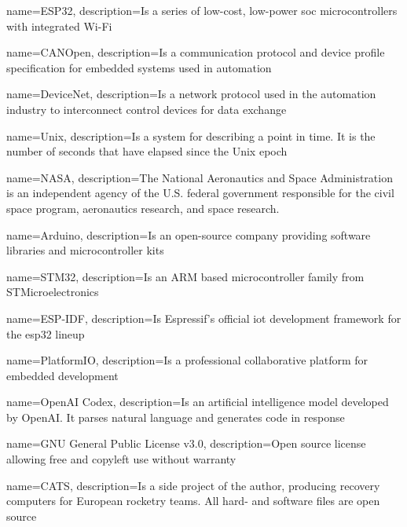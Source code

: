{
        name=ESP32,
        description={Is a series of low-cost, low-power \acrlong{soc} microcontrollers with integrated Wi-Fi}
}

{
        name=CANOpen,
        description={Is a communication protocol and device profile specification for embedded systems used in automation}
}

{
        name=DeviceNet,
        description={Is a network protocol used in the automation industry to interconnect control devices for data exchange}
}

{
        name=Unix,
        description={Is a system for describing a point in time. It is the number of seconds that have elapsed since the Unix epoch}
}

{
        name=NASA,
        description={The National Aeronautics and Space Administration is an independent agency of the U.S. federal government responsible for the civil space program, aeronautics research, and space research.}
}

{
        name=Arduino,
        description={Is an open-source company providing software libraries and microcontroller kits}
}

{
        name=STM32,
        description={Is an ARM based microcontroller family from STMicroelectronics}
}

{
        name=ESP-IDF,
        description={Is Espressif's official \acrshort{iot} development framework for the \gls{esp32} lineup}
}

{
        name=PlatformIO,
        description={Is a professional collaborative platform for embedded development}
}

{
        name=OpenAI Codex,
        description={Is an artificial intelligence model developed by OpenAI. It parses natural language and generates code in response}
}

{
        name=GNU General Public License v3.0,
        description={Open source license allowing free and copyleft use without warranty}
}

{
        name=CATS,
        description={Is a side project of the author, producing recovery computers for European rocketry teams. All hard- and software files are open source}
}

